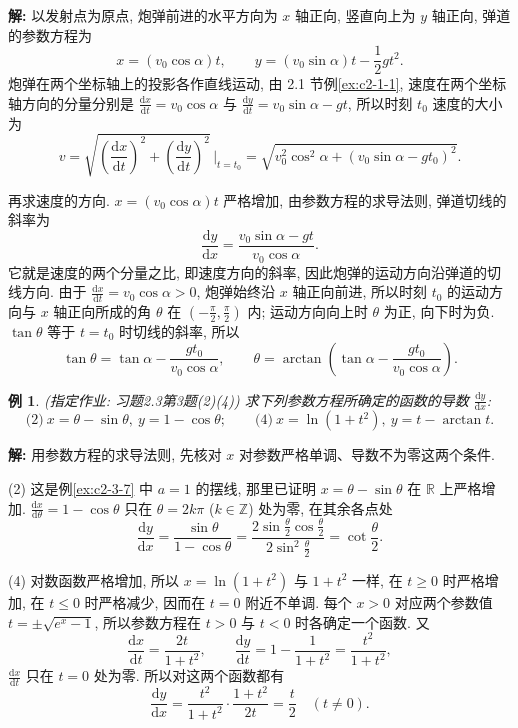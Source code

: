 \documentclass[UTF8,openany]{ctexbook}
\theoremstyle{chinesetextbook}
\newtheorem{example}{例}[section]
\newenvironment{cnsolution}{\par\indent\textbf{解:} \ignorespaces}{\par}
\newcommand{\dd}{\mathrm d}
\begin{document}
\begin{cnsolution}
以发射点为原点, 炮弹前进的水平方向为 $x$ 轴正向, 竖直向上为 $y$ 轴正向, 弹道的参数方程为
\[
x=(v_0\cos\alpha)t,\qquad y=(v_0\sin\alpha)t-\frac12gt^2.
\]
炮弹在两个坐标轴上的投影各作直线运动, 由 2.1 节例\ref{ex:c2-1-1}, 速度在两个坐标轴方向的分量分别是 $\displaystyle\frac{\dd x}{\dd t}=v_0\cos\alpha$ 与 $\displaystyle\frac{\dd y}{\dd t}=v_0\sin\alpha-gt$, 所以时刻 $t_0$ 速度的大小为
\[
v=\sqrt{\left(\frac{\dd x}{\dd t}\right)^2+\left(\frac{\dd y}{\dd t}\right)^2}\,\Bigg|_{t=t_0}=\sqrt{v_0^2\cos^2\alpha+(v_0\sin\alpha-gt_0)^2}.
\]

再求速度的方向. $x=(v_0\cos\alpha)t$ 严格增加, 由参数方程的求导法则, 弹道切线的斜率为
\[
\frac{\dd y}{\dd x}=\frac{v_0\sin\alpha-gt}{v_0\cos\alpha}.
\]
它就是速度的两个分量之比, 即速度方向的斜率, 因此炮弹的运动方向沿弹道的切线方向. 由于 $\displaystyle\frac{\dd x}{\dd t}=v_0\cos\alpha>0$, 炮弹始终沿 $x$ 轴正向前进, 所以时刻 $t_0$ 的运动方向与 $x$ 轴正向所成的角 $\theta$ 在 $\displaystyle\left(-\frac\pi2,\frac\pi2\right)$ 内; 运动方向向上时 $\theta$ 为正, 向下时为负. $\tan\theta$ 等于 $t=t_0$ 时切线的斜率, 所以
\[
\tan\theta=\tan\alpha-\frac{gt_0}{v_0\cos\alpha},\qquad\theta=\arctan\left(\tan\alpha-\frac{gt_0}{v_0\cos\alpha}\right).
\]

\end{cnsolution}
\begin{example}\label{ex:c2-h3-3}
\textnormal{(指定作业: 习题2.3第3题(2)(4))} 求下列参数方程所确定的函数的导数 $\displaystyle\frac{\dd y}{\dd x}$:
\[
\text{(2)}\ x=\theta-\sin\theta,\ y=1-\cos\theta;\qquad\text{(4)}\ x=\ln(1+t^2),\ y=t-\arctan t.
\]
\end{example}
\begin{cnsolution}
用参数方程的求导法则, 先核对 $x$ 对参数严格单调、导数不为零这两个条件.

(2) 这是例\ref{ex:c2-3-7} 中 $a=1$ 的摆线, 那里已证明 $x=\theta-\sin\theta$ 在 $\mathbb R$ 上严格增加. $\displaystyle\frac{\dd x}{\dd\theta}=1-\cos\theta$ 只在 $\theta=2k\pi$ ($k\in\mathbb Z$) 处为零, 在其余各点处
\[
\frac{\dd y}{\dd x}=\frac{\sin\theta}{1-\cos\theta}=\frac{2\sin\frac\theta2\cos\frac\theta2}{2\sin^2\frac\theta2}=\cot\frac\theta2.
\]

(4) 对数函数严格增加, 所以 $x=\ln(1+t^2)$ 与 $1+t^2$ 一样, 在 $t\ge0$ 时严格增加, 在 $t\le0$ 时严格减少, 因而在 $t=0$ 附近不单调. 每个 $x>0$ 对应两个参数值 $t=\pm\sqrt{e^x-1}$, 所以参数方程在 $t>0$ 与 $t<0$ 时各确定一个函数. 又
\[
\frac{\dd x}{\dd t}=\frac{2t}{1+t^2},\qquad\frac{\dd y}{\dd t}=1-\frac1{1+t^2}=\frac{t^2}{1+t^2},
\]
$\displaystyle\frac{\dd x}{\dd t}$ 只在 $t=0$ 处为零. 所以对这两个函数都有
\[
\frac{\dd y}{\dd x}=\frac{t^2}{1+t^2}\cdot\frac{1+t^2}{2t}=\frac t2\quad(t\ne0).
\]
\end{cnsolution}
\end{document}
